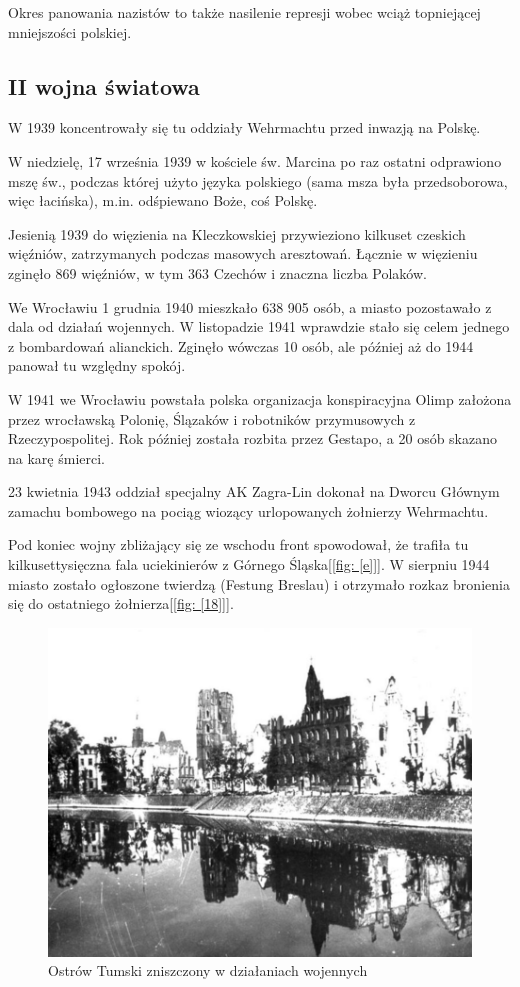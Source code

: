 \documentclass{article}
\begin{document}
Okres panowania nazistów to także nasilenie represji wobec wciąż topniejącej mniejszości polskiej.



\subsection {II wojna światowa}
W 1939 koncentrowały się tu oddziały Wehrmachtu przed inwazją na Polskę.

W niedzielę, 17 września 1939 w kościele św. Marcina po raz ostatni odprawiono mszę św., podczas której użyto języka polskiego (sama msza była przedsoborowa, więc łacińska), m.in. odśpiewano Boże, coś Polskę.

Jesienią 1939 do więzienia na Kleczkowskiej przywieziono kilkuset czeskich więźniów, zatrzymanych podczas masowych aresztowań. Łącznie w więzieniu zginęło 869 więźniów, w tym 363 Czechów i znaczna liczba Polaków.

We Wrocławiu 1 grudnia 1940 mieszkało 638 905 osób, a miasto pozostawało z dala od działań wojennych. W listopadzie 1941 wprawdzie stało się celem jednego z bombardowań alianckich. Zginęło wówczas 10 osób, ale później aż do 1944 panował tu względny spokój.

W 1941 we Wrocławiu powstała polska organizacja konspiracyjna Olimp założona przez wrocławską Polonię, Ślązaków i robotników przymusowych z Rzeczypospolitej. Rok później została rozbita przez Gestapo, a 20 osób skazano na karę śmierci.

23 kwietnia 1943 oddział specjalny AK Zagra-Lin dokonał na Dworcu Głównym zamachu bombowego na pociąg wiozący urlopowanych żołnierzy Wehrmachtu.

Pod koniec wojny zbliżający się ze wschodu front spowodował, że trafiła tu kilkusettysięczna fala uciekinierów z Górnego Śląska[\ref{fig: [e]}]. W sierpniu 1944 miasto zostało ogłoszone twierdzą (Festung Breslau) i otrzymało rozkaz bronienia się do ostatniego żołnierza[\ref{fig: [18]}].

\begin{center}
\begin{figure}[h]
	\centering
	\includegraphics[scale=0.9]{Ostrów.png}
	\caption{Ostrów Tumski zniszczony w działaniach wojennych}
\end{figure}
\end{center}
\end{document}
